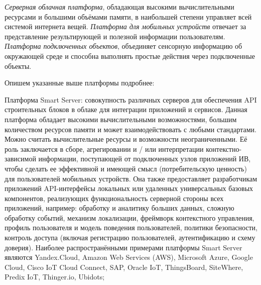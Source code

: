 \textit{Серверная облачная платформа}, обладающая высокими вычислительными ресурсами и большими объёмами памяти, в наибольшей степени управляет всей системой интернета вещей. \textit{Платформа для мобильных устройств} отвечает за представление результирующей и полезной информации пользователям. \textit{Платформа подключенных объектов}, объединяет сенсорную информацию об окружающей среде и способна выполнять простые действия через подключенные объекты.

Опишем указанные выше платформы подробнее:
\begin{textitemize}
    \item Платформа Smart Server: совокупность различных серверов для обеспечения API строительных блоков в облаке для интеграции приложений и сервисов. Данная платформа обладает высокими вычислительными возможностями, большим количеством ресурсов памяти и может взаимодействовать с любыми стандартами. Можно считать вычислительные ресурсы и возможности неограниченными. Её роль заключается в сборе, агрегировании и / или интерпретации контекстно-зависимой информации, поступающей от подключенных узлов приложений ИВ, чтобы сделать ее эффективной и имеющей смысл (потребительскую ценность) для пользователей мобильных устройств. Она также предоставляет разработчикам приложений API-интерфейсы локальных или удаленных универсальных базовых компонентов, реализующих функциональность серверной стороны всех приложений, например: обработку и аналитику больших данных, сложную обработку событий, механизм локализации, фреймворк контекстного управления, профиль пользователя и модель поведения пользователей, политики безопасности, контроль доступа (включая регистрацию пользователей, аутентификацию и схему доверия). Наиболее распространёнными примерами платформы Smart Server являются Yandex.Cloud, Amazon Web Services (AWS), Microsoft Azure, Google Cloud, Cisco IoT Cloud Connect, SAP, Oracle IoT, ThingsBoard, SiteWhere, Predix IoT, Thinger.io, Ubidots;

\end{textitemize}
